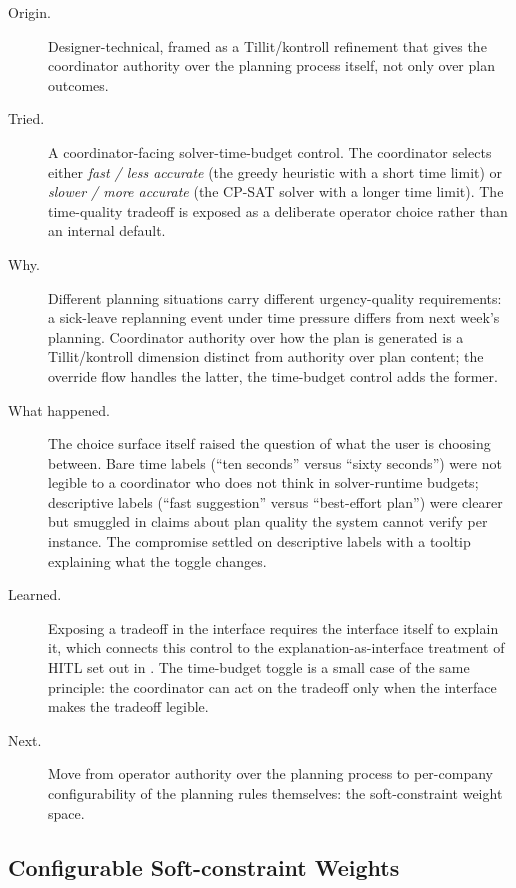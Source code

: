 \begin{description}
  \item[Origin.] Designer-technical, framed as a Tillit/kontroll refinement that gives the coordinator authority over the planning process itself, not only over plan outcomes.
  \item[Tried.] A coordinator-facing solver-time-budget control. The coordinator selects either \emph{fast / less accurate} (the greedy heuristic with a short time limit) or \emph{slower / more accurate} (the CP-SAT solver with a longer time limit). The time-quality tradeoff is exposed as a deliberate operator choice rather than an internal default.
  \item[Why.] Different planning situations carry different urgency-quality requirements: a sick-leave replanning event under time pressure differs from next week's planning. Coordinator authority over how the plan is generated is a Tillit/kontroll dimension distinct from authority over plan content; the override flow handles the latter, the time-budget control adds the former.
  \item[What happened.] The choice surface itself raised the question of what the user is choosing between. Bare time labels (``ten seconds'' versus ``sixty seconds'') were not legible to a coordinator who does not think in solver-runtime budgets; descriptive labels (``fast suggestion'' versus ``best-effort plan'') were clearer but smuggled in claims about plan quality the system cannot verify per instance. The compromise settled on descriptive labels with a tooltip explaining what the toggle changes.
  \item[Learned.] Exposing a tradeoff in the interface requires the interface itself to explain it, which connects this control to the explanation-as-interface treatment of HITL set out in . The time-budget toggle is a small case of the same principle: the coordinator can act on the tradeoff only when the interface makes the tradeoff legible.
  \item[Next.] Move from operator authority over the planning process to per-company configurability of the planning rules themselves: the soft-constraint weight space.
\end{description}

\subsection{Configurable Soft-constraint Weights}
\label{sec:iter-weights}

